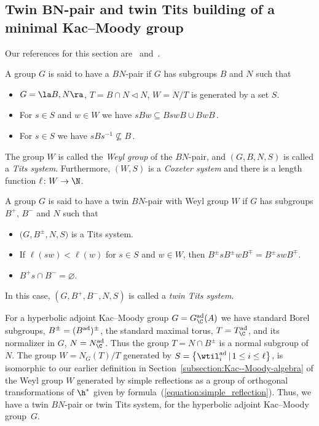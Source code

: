 \subsection[Twin $BN$-pair and twin Tits building of a minimal Kac--Moody group]{Twin $\boldsymbol{BN}$-pair and twin Tits building of a minimal Kac--Moody group}\label{subsection:BNpair_Tits_building}

Our references for this section are~\cite[Sections 6.2 and 6.3]{AbramenkoBrown08} and~\cite[Chapters~5 and~11]{Ronan89}.
\begin{Definition}[BN-pair]\label{definition:BN-pair} A group $G$ is said to have a $BN$-pair if $G$ has subgroups $B$ and $N$ such that
\begin{itemize}\itemsep=0pt
\item[T1:] $G=\la B,N\ra$, $T = B\cap N \lhd N$, $W = N/T$ is generated by a set $S$.
\item[T2:] For $s\in S$ and $w\in W$ we have $sB w\subseteq B s wB \cup B wB\,$.
\item[T3:] For $s\in S$ we have $sB s^{-1}\not\subseteq B\,$.
\end{itemize}
The group $W$ is called the {\it Weyl group} of the $BN$-pair, and $(G,B,N,S)$ is called a {\it Tits system}. Furthermore, $(W,S)$ is a {\it Coxeter system} and there is a length function $\ell\colon W\to\N$.
\end{Definition}
\begin{Definition} \label{definition:Twin-BN-pair}
A group $G$ is said to have a twin $BN$-pair with Weyl group $W$ if $G$ has subgroups $B^+$, $B^-$ and $N$ such that
\begin{itemize}\itemsep=0pt
\item[TW1:] $\big(G,B^\pm,N,S\big)$ is a Tits system.
\item[TW2:] If $\ell(sw) < \ell(w)$ for $s\in S$ and $w\in W$, then $B^\pm s B^\pm w B^\mp = B^\pm sw B^\mp$.
\item[TW3:] $B^+ s \cap B^- = \varnothing$.
\end{itemize}
In this case, $(G,B^+,B^-,N,S)$ is called a {\it twin Tits system}.
\end{Definition}

For a hyperbolic adjoint Kac--Moody group $G = G^{\rm ad}_\C(A)$ we have standard Borel subgroups,
$B^{\pm} = (B^{\rm ad})^\pm$, the standard maximal torus, $T = T^{\rm ad}_\C$, and its normalizer in $G$,
$N = N_\C^{\rm ad}$. Thus the group $T = N\cap B^{\pm}$ is a normal subgroup of $N$.
The group $W = N_G(T)/T$ generated by $S = \big\{\wtil^{\rm ad}_i\,|\, 1\leq i\leq\ell\big\}$, is isomorphic to our
earlier definition in Section~\ref{subsection:Kac--Moody-algebra}
of the Weyl group $W$ generated by simple reflections as a group of orthogonal transformations of $\h^*$ given by formula~(\ref{equation:simple_reflection}). Thus, we have a twin $BN$-pair or twin Tits system, for the hyperbolic adjoint Kac--Moody group~$G$.

